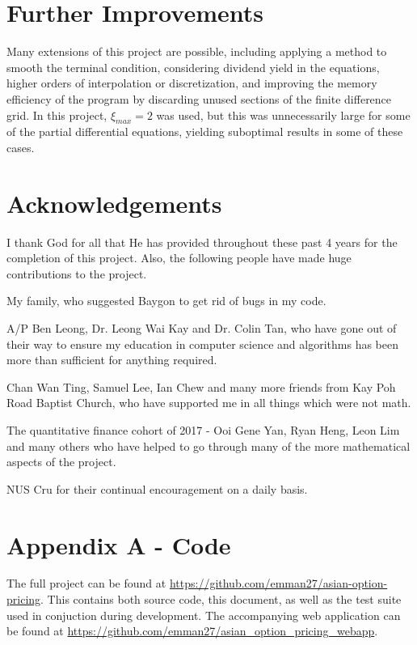 \documentclass{article}
\begin{document}
\section{Further Improvements}

Many extensions of this project are possible, including applying a method to smooth the terminal condition, considering dividend yield in the equations, higher orders of interpolation or discretization, and improving the memory efficiency of the program by discarding unused sections of the finite difference grid. In this project, \(\xi_{max}=2\) was used, but this was unnecessarily large for some of the partial differential equations, yielding suboptimal results in some of these cases.

\section{Acknowledgements}

I thank God for all that He has provided throughout these past 4 years for the completion of this project. Also, the following people have made huge contributions to the project.

My family, who suggested Baygon to get rid of bugs in my code.

A/P Ben Leong, Dr. Leong Wai Kay and Dr. Colin Tan, who have gone out of their way to ensure my education in computer science and algorithms has been more than sufficient for anything required.

Chan Wan Ting, Samuel Lee, Ian Chew and many more friends from Kay Poh Road Baptist Church, who have supported me in all things which were not math.

The quantitative finance cohort of 2017 - Ooi Gene Yan, Ryan Heng, Leon Lim and many others who have helped to go through many of the more mathematical aspects of the project.

NUS Cru for their continual encouragement on a daily basis.

\section{Appendix A - Code}

\sloppy
The full project can be found at \url{https://github.com/emman27/asian-option-pricing}. This contains both source code, this document, as well as the test suite used in conjuction during development. The accompanying web application can be found at \url{https://github.com/emman27/asian_option_pricing_webapp}.
\end{document}
